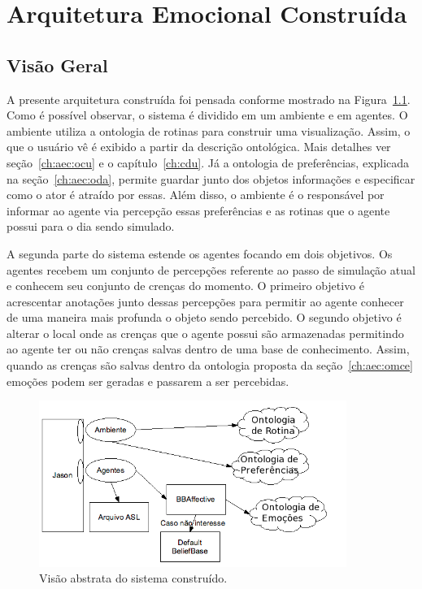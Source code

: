 \chapter{Arquitetura Emocional Constru\'ida} \label{ch:aec}

\section{Visão Geral}

A presente arquitetura construída foi pensada conforme mostrado na
Figura~\ref{fig:vasc}. Como é possível observar, o sistema é dividido em um
ambiente e em agentes. O ambiente utiliza a ontologia de rotinas para
construir uma visualização. Assim, o que o usuário vê é exibido a partir da
descrição ontológica. Mais detalhes ver seção~\ref{ch:aec:ocu} e o
capítulo~\ref{ch:cdu}. Já a ontologia de preferências, explicada na
seção~\ref{ch:aec:oda}, permite guardar junto dos objetos informações e
especificar como o ator é atraído por essas.\dev{} Além disso, o ambiente é
o responsável por informar ao agente via percepção essas preferências e as
rotinas que o agente possui para o dia sendo simulado.

A segunda parte do sistema estende os agentes focando em dois objetivos.
Os agentes recebem um conjunto de percepções referente ao passo de simulação
atual e conhecem seu conjunto de crenças do momento.
O primeiro objetivo é acrescentar anotações junto dessas percepções para permitir ao agente conhecer de uma maneira mais profunda o objeto sendo percebido.
O segundo objetivo é alterar o local onde as crenças que o agente possui são
armazenadas permitindo ao agente ter ou não crenças salvas dentro de uma
base de conhecimento. Assim, quando as crenças são salvas dentro da ontologia
proposta da seção~\ref{ch:aec:omce} emoções podem ser geradas e passarem a ser
percebidas.

\begin{figure}
  \centering
  \includegraphics[width=10cm]{figuras/visao-geral.png}
  \caption{Visão abstrata do sistema construído.}
  \label{fig:vasc}
\end{figure}

